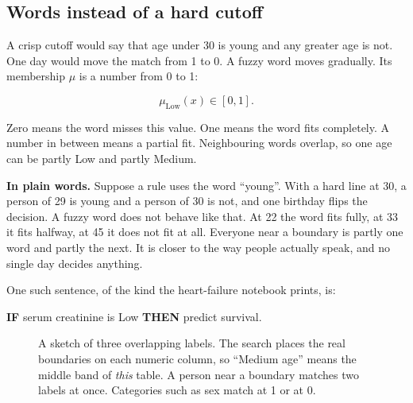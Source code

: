 \documentclass[11pt]{article}
\begin{document}
\subsection{Words instead of a hard cutoff}

A crisp cutoff would say that age under 30 is young and any greater age is not. One day would move the match from 1 to 0. A fuzzy word moves gradually. Its membership \(\mu\) is a number from 0 to 1:

\[
\mu_{\mathrm{Low}}(x) \in [0, 1].
\]

Zero means the word misses this value. One means the word fits completely. A number in between means a partial fit. Neighbouring words overlap, so one age can be partly Low and partly Medium.

\begin{plainwords}
\textbf{In plain words.} Suppose a rule uses the word ``young''. With a hard line at 30, a person of 29 is young and a person of 30 is not, and one birthday flips the decision. A fuzzy word does not behave like that. At 22 the word fits fully, at 33 it fits halfway, at 45 it does not fit at all. Everyone near a boundary is partly one word and partly the next. It is closer to the way people actually speak, and no single day decides anything.
\end{plainwords}

One such sentence, of the kind the heart-failure notebook prints, is:

\begin{center}
{\sffamily\bfseries IF} serum creatinine is Low \textbf{THEN} predict survival.
\end{center}

\begin{figure}[H]
\centering
{}
\caption{A sketch of three overlapping labels. The search places the real boundaries on each numeric column, so ``Medium age'' means the middle band of \emph{this} table. A person near a boundary matches two labels at once. Categories such as sex match at 1 or at 0.}
\end{figure}
\end{document}
